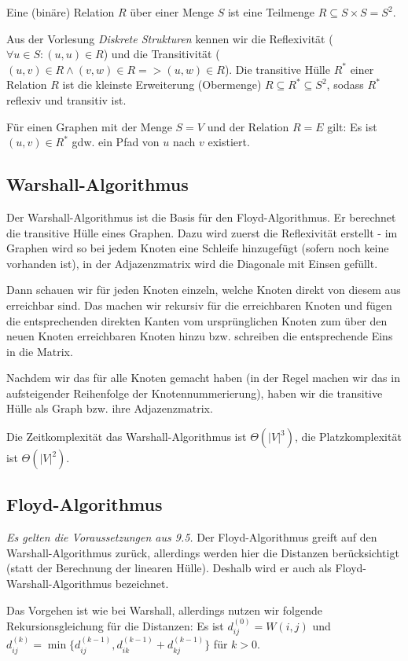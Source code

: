 \documentclass[12pt]{article}
\begin{document}
Eine (binäre) Relation $R$ über einer Menge $S$ ist eine Teilmenge $R \subseteq S \times S = S^2$.

Aus der Vorlesung \textit{Diskrete Strukturen} kennen wir die Reflexivität ($\forall u \in S : (u, u) \in R$) und die Transitivität ($(u, v) \in R \land (v, w) \in R => (u, w) \in R$). Die transitive Hülle $R^*$ einer Relation $R$ ist die kleinste Erweiterung (Obermenge) $R \subseteq R^* \subseteq S^2$, sodass $R^*$ reflexiv und transitiv ist.

Für einen Graphen mit der Menge $S = V$ und der Relation $R = E$ gilt: Es ist $(u, v) \in R^*$ gdw. ein Pfad von $u$ nach $v$ existiert.

\subsection{Warshall-Algorithmus}

Der Warshall-Algorithmus ist die Basis für den Floyd-Algorithmus. Er berechnet die transitive Hülle eines Graphen. Dazu wird zuerst die Reflexivität erstellt - im Graphen wird so bei jedem Knoten eine Schleife hinzugefügt (sofern noch keine vorhanden ist), in der Adjazenzmatrix wird die Diagonale mit Einsen gefüllt.

Dann schauen wir für jeden Knoten einzeln, welche Knoten direkt von diesem aus erreichbar sind. Das machen wir rekursiv für die erreichbaren Knoten und fügen die entsprechenden direkten Kanten vom ursprünglichen Knoten zum über den neuen Knoten erreichbaren Knoten hinzu bzw. schreiben die entsprechende Eins in die Matrix.

Nachdem wir das für alle Knoten gemacht haben (in der Regel machen wir das in aufsteigender Reihenfolge der Knotennummerierung), haben wir die transitive Hülle als Graph bzw. ihre Adjazenzmatrix.

Die Zeitkomplexität das Warshall-Algorithmus ist $\Theta(|V|^3)$, die Platzkomplexität ist $\Theta(|V|^2)$.

\subsection{Floyd-Algorithmus}

\textit{Es gelten die Voraussetzungen aus 9.5.} Der Floyd-Algorithmus greift auf den Warshall-Algorithmus zurück, allerdings werden hier die Distanzen berücksichtigt (statt der Berechnung der linearen Hülle). Deshalb wird er auch als Floyd-Warshall-Algorithmus bezeichnet.

Das Vorgehen ist wie bei Warshall, allerdings nutzen wir folgende Rekursionsgleichung für die Distanzen: Es ist $d_{ij}^{(0)} = W(i, j)$ und $d_{ij}^{(k)} = \min \{d_{ij}^{(k-1)}, d_{ik}^{(k-1)} + d_{kj}^{(k-1)}\}$ für $k > 0$.
\end{document}
